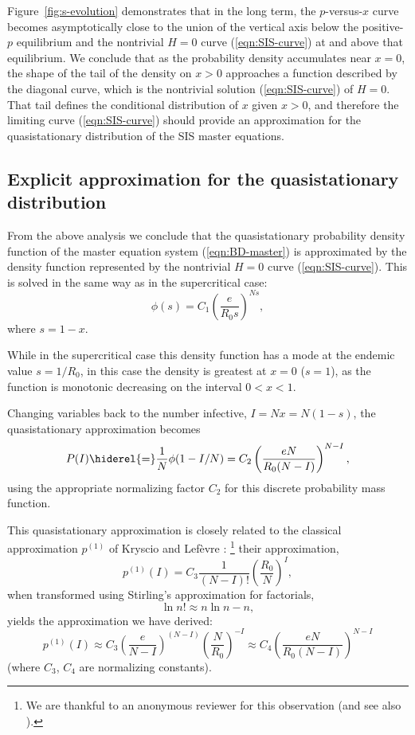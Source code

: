 \documentclass[review]{elsarticle}
\begin{document}
Figure~\ref{fig:s-evolution} demonstrates that in the long term,
the $p$-versus-$x$ curve becomes asymptotically close to the union of the
vertical axis below the positive-$p$ equilibrium and the nontrivial
$H=0$ curve (\ref{eqn:SIS-curve}) at and above that equilibrium.
We conclude that as the probability density accumulates near $x=0$,
the shape of the tail of the density on $x>0$ approaches a function
described by the diagonal curve, which is the nontrivial solution
(\ref{eqn:SIS-curve}) of $H=0$.
That tail defines the conditional distribution of $x$ given $x>0$,
and therefore the limiting curve (\ref{eqn:SIS-curve})
should provide an approximation
for the quasistationary distribution of the SIS master equations.

\subsection{Explicit approximation for the quasistationary distribution}

From the above analysis we conclude that the quasistationary
probability density function
of the master equation system (\ref{eqn:BD-master})
is approximated by the density function represented by the nontrivial
$H=0$ curve (\ref{eqn:SIS-curve}).  This is solved in the
same way as in the supercritical case:
\begin{dmath}\label{eqn:SIS-QS}
  \phi(s) = C_1 \left(\frac{e}{R_0s}\right)^{Ns},
\end{dmath}
where $s=1-x$.

While in the supercritical case this density function has a mode
at the endemic value $s=1/R_0$,
in this case the density is greatest at $x=0$ ($s=1$), as the
function is monotonic decreasing on the interval $0<x<1$.

Changing variables back to the number infective, $I=Nx=N(1-s)$, 
the quasistationary approximation becomes
\begin{dmath} \label{eqn:SIS-QS-discrete}
  P(I) \hiderel{=} \frac{1}{N}\phi(1-I/N) = C_2 \left(\frac{eN}{R_0(N-I)}\right)^{N-I},
\end{dmath}
using the appropriate normalizing factor $C_2$ for this
discrete probability mass function.

This quasistationary approximation is closely related to the classical
approximation $p^{(1)}$ of Kryscio and Lef\`evre
\cite{kryscio_extinction_1989,nasell_quasi-stationary_1996}:%
\footnote{We are thankful to an anonymous reviewer for this
observation (and see also \cite{kurtz1971limit}).}
their approximation,
\begin{dmath*}
  p^{(1)}(I) = C_3 \frac{1}{(N-I)!} \left(\frac{R_0}{N}\right)^I,
\end{dmath*}
when transformed using Stirling's approximation for factorials,
\begin{dmath*}
  \ln n! \approx n\ln n - n,
\end{dmath*}
yields the approximation we have derived:
\begin{dmath*}
  p^{(1)}(I) 
    \approx C_3 \left(\frac{e}{N-I}\right)^{(N-I)} \left(\frac{N}{R_0}\right)^{-I}
    \approx C_4 \left(\frac{eN}{R_0(N-I)}\right)^{N-I}
\end{dmath*}
(where $C_3$, $C_4$ are normalizing constants).
\end{document}
